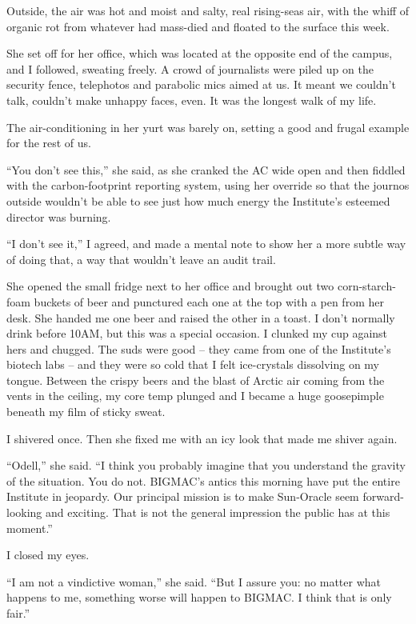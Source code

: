 Outside, the air was hot and moist and salty, real rising-seas air, 
with the whiff of organic rot from whatever had mass-died and floated 
to the surface this week.

She set off for her office, which was located at the opposite end of 
the campus, and I followed, sweating freely. A crowd of journalists 
were piled up on the security fence, telephotos and parabolic mics 
aimed at us. It meant we couldn't talk, couldn't make unhappy faces, 
even. It was the longest walk of my life.

The air-conditioning in her yurt was barely on, setting a good and 
frugal example for the rest of us.

“You don't see this,” she said, as she cranked the AC wide open and 
then fiddled with the carbon-footprint reporting system, using her 
override so that the journos outside wouldn't be able to see just how 
much energy the Institute's esteemed director was burning.

“I don't see it,” I agreed, and made a mental note to show her a 
more subtle way of doing that, a way that wouldn't leave an audit trail.

She opened the small fridge next to her office and brought out two 
corn-starch-foam buckets of beer and punctured each one at the top with 
a pen from her desk. She handed me one beer and raised the other in a 
toast. I don't normally drink before 10AM, but this was a special 
occasion. I clunked my cup against hers and chugged. The suds were good 
-- they came from one of the Institute's biotech labs -- and they were 
so cold that I felt ice-crystals dissolving on my tongue. Between the 
crispy beers and the blast of Arctic air coming from the vents in the 
ceiling, my core temp plunged and I became a huge goosepimple beneath 
my film of sticky sweat.

I shivered once. Then she fixed me with an icy look that made me shiver 
again.

“Odell,” she said. “I think you probably imagine that you 
understand the gravity of the situation. You do not. BIGMAC's antics 
this morning have put the entire Institute in jeopardy. Our principal 
mission is to make Sun-Oracle seem forward-looking and exciting. That 
is not the general impression the public has at this moment.”

I closed my eyes.

“I am not a vindictive woman,” she said. “But I assure you: no 
matter what happens to me, something worse will happen to BIGMAC. I 
think that is only fair.”

